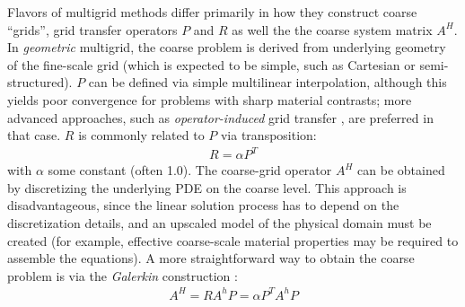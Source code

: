 Flavors of multigrid methods differ primarily in how they construct coarse ``grids'', grid transfer operators $P$ and $R$ as well the the coarse system matrix $A^H$.   In \textit{geometric} multigrid, the coarse problem is derived from underlying geometry of the fine-scale grid (which is expected to be simple, such as Cartesian or semi-structured).   $P$ can be defined via simple multilinear interpolation, although this yields poor convergence for problems with sharp material contrasts; more advanced approaches, such as \textit{operator-induced} grid transfer \cite{Alcouffe1981}, are preferred in that case.   $R$ is commonly related to $P$ via transposition:
\begin{align}
    R = \alpha P^T
\end{align}
with $\alpha$ some constant (often 1.0).   The coarse-grid operator $A^H$ can be obtained by discretizing the underlying PDE on the coarse level.   This approach is disadvantageous, since the linear solution process has to depend on the discretization details, and an upscaled model of the physical domain must be created (for example, effective coarse-scale material properties may be required to assemble the equations).   A more straightforward way to obtain the coarse problem is via the \textit{Galerkin} construction \cite{Nicolaides1975}:
\begin{align}
    A^H = R A^h P = \alpha P^T A^h P
\end{align}
